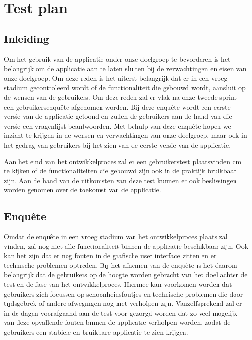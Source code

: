 \section{Test plan}
\subsection{Inleiding}
Om het gebruik van de applicatie onder onze doelgroep te bevorderen is het belangrijk om de applicatie aan te laten sluiten bij de verwachtingen en eisen van onze doelgroep. Om deze reden is het uiterst belangrijk dat er in een vroeg stadium gecontroleerd wordt of de functionaliteit die gebouwd wordt, aansluit op de wensen van de gebruikers. Om deze reden zal er vlak na onze tweede sprint een gebruikersenquête afgenomen worden. Bij deze enquête wordt een eerste versie van de applicatie getoond en zullen de gebruikers aan de hand van die versie een vragenlijst beantwoorden. Met behulp van deze enquête hopen we inzicht te krijgen in de wensen en verwachtingen van onze doelgroep, maar ook in het gedrag van gebruikers bij het zien van de eerste versie van de applicatie.

Aan het eind van het ontwikkelproces zal er een gebruikerstest plaatsvinden om te kijken of de functionaliteiten die gebouwd zijn ook in de praktijk bruikbaar zijn. Aan de hand van de uitkomsten van deze test kunnen er ook beslissingen worden genomen over de toekomst van de applicatie.

\subsection{Enquête}
Omdat de enquête in een vroeg stadium van het ontwikkelproces plaats zal vinden, zal nog niet alle functionaliteit binnen de applicatie beschikbaar zijn. Ook kan het zijn dat er nog fouten in de grafische user interface zitten en er technische problemen optreden. Bij het afnemen van de enquête is het daarom belangrijk dat de gebruikers op de hoogte worden gebracht van het doel achter de test en de fase van het ontwikkelproces. Hiermee kan voorkomen worden dat gebruikers zich focussen op schoonheidsfoutjes en technische problemen die door tijdsgebrek of andere afwegingen nog niet verholpen zijn. Vanzelfsprekend zal er in de dagen voorafgaand aan de test voor gezorgd worden dat zo veel mogelijk van deze opvallende fouten binnen de applicatie verholpen worden, zodat de gebruikers een stabiele en bruikbare applicatie te zien krijgen.

\bigskip

